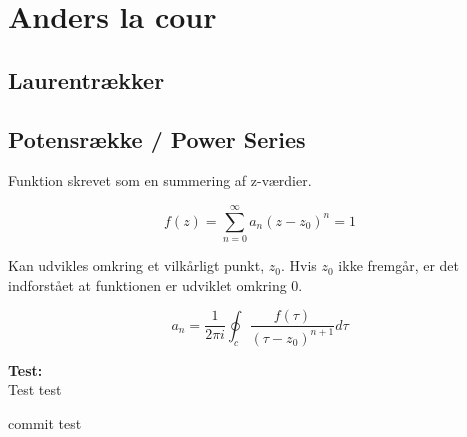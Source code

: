 \chapter{Anders la cour}

\section{Laurentrækker}

\section{Potensrække / Power Series}

Funktion skrevet som en summering af z-værdier. 


\begin{equation*}
       f(z)=\sum_{n=0}^{\infty} a_{n}(z-z_0)^{n} = 1  
\end{equation*}

Kan udvikles omkring et vilkårligt punkt, \(z_0\).
Hvis \(z_0\) ikke fremgår, er det indforstået at funktionen er udviklet omkring 0. 


\begin{equation*}
a_n = \frac{1}{2\pi i} \oint_c \frac{f(\tau)}{(\tau-z_0)^{n+1}} d\tau
\end{equation*}


\begin{tcolorbox}[colback=white!5!white,colframe=blue!75!black]
  \textbf{Test:}\\
Test test
\end{tcolorbox}

commit test

